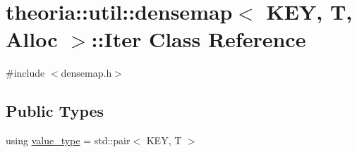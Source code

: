 \hypertarget{classtheoria_1_1util_1_1densemap_1_1Iter}{}\section{theoria\+:\+:util\+:\+:densemap$<$ K\+EY, T, Alloc $>$\+:\+:Iter Class Reference}
\label{classtheoria_1_1util_1_1densemap_1_1Iter}


{\ttfamily \#include $<$densemap.\+h$>$}

\subsection*{Public Types}
\begin{DoxyCompactItemize}
\item 
using \hyperlink{classtheoria_1_1util_1_1densemap_1_1Iter_a8a1cedbd37c4faee8284d6f1debd49f2}{value\+\_\+type} = std\+::pair$<$ K\+EY, T $>$
\end{DoxyCompactItemize}
